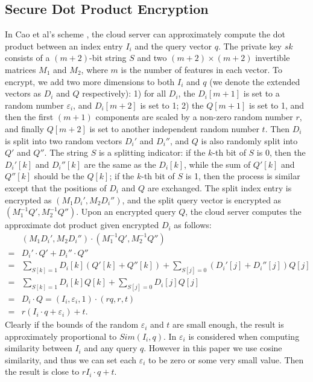 \documentclass{article}
\begin{document}
\subsection{Secure Dot Product Encryption}
In Cao et al's scheme \cite{Cao14}, the cloud server can approximately compute the dot product between an index entry $I_i$ and the query vector $q$. The private key $sk$ consists of a $(m+2)$-bit string $S$ and two $(m+2)\times (m+2)$ invertible matrices $M_1$ and $M_2$, where $m$ is the number of features in each vector. To encrypt, we add two more dimensions to both $I_i$ and $q$ (we denote the extended vectors as $D_i$ and $Q$ respectively): 1) for all $D_i$, the $D_i[m+1]$ is set to a random number $\varepsilon_i$, and $D_i[m+2]$ is set to 1; 2) the $Q[m+1]$ is set to 1, and then the first $(m+1)$ components are scaled by a non-zero random number $r$, and finally $Q[m+2]$ is set to another independent random number $t$. Then $D_i$ is split into two random vectors $D_i'$ and $D_i''$, and $Q$ is also randomly split into $Q'$ and $Q''$. The string $S$ is a splitting indicator: if the $k$-th bit of $S$ is 0, then the $D_i'[k]$ and $D_i''[k]$ are the same as the $D_i[k]$, while the sum of $Q'[k]$ and $Q''[k]$ should be the $Q[k]$; if the $k$-th bit of $S$ is 1, then the process is similar except that the positions of $D_i$ and $Q$ are exchanged. The split index entry is encrypted as $(M_1D_i', M_2D_i'')$, and the split query vector is encrypted as $(M_1^{-1}Q', M_2^{-1}Q'')$. Upon an encrypted query $Q$, the cloud server computes the approximate dot product given encrypted $D_i$ as follows:
\begin{equation*}
\begin{aligned}
&(M_1D_i', M_2D_i'')\cdot(M_1^{-1}Q', M_2^{-1}Q'') \\
=&D_i'\cdot Q' + D_i''\cdot Q''\\
=&\sum_{S[k]=1}D_i[k](Q'[k] + Q''[k]) + \sum_{S[j]=0} (D_i'[j]+ D_i''[j])Q[j]\\
=&\sum_{S[k]=1}D_i[k]Q[k] + \sum_{S[j]=0} D_i[j]Q[j]\\
=&D_i \cdot Q = (I_i,\varepsilon_i,1)\cdot (rq,r,t)\\
=&r(I_i\cdot q+\varepsilon_i)+t.
\end{aligned}
\end{equation*}
Clearly if the bounds of the random $\varepsilon_i$ and $t$ are small enough, the result is approximately proportional to $Sim(I_i, q)$. In \cite{Cao14} $\varepsilon_i$ is considered when computing similarity between $I_i$ and any query $q$. However in this paper we use cosine similarity, and thus we can set each $\varepsilon_i$ to be zero or some very small value. Then the result is close to $rI_i\cdot q+t$. 
\end{document}
